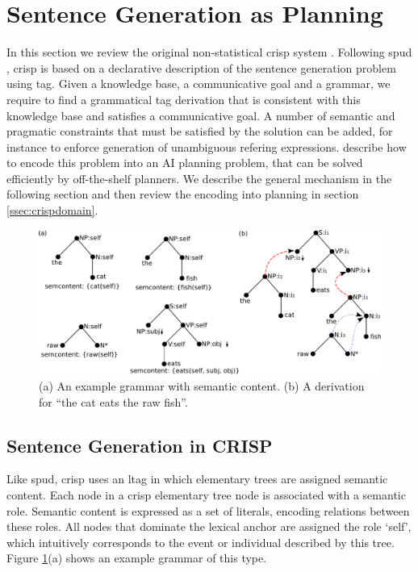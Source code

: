 \section{Sentence Generation as Planning}
\label{sec:crisp}
In this section we review the original non-statistical {\sc crisp} system \cite{kollerstone2007}. 
Following {\sc spud} \cite{stonedoran1997}, {\sc crisp} is based on a declarative description of the sentence generation problem using {\sc tag}. Given a knowledge base, a communicative goal and a grammar, we require to find a grammatical {\sc tag} derivation that is consistent with this knowledge base and satisfies a communicative goal. A number of semantic and pragmatic constraints that must be satisfied by the solution can be added, for instance to enforce generation of unambiguous refering expressions.  describe how to encode this problem into an AI planning problem, that can be solved efficiently by off-the-shelf planners. We describe the general mechanism in the following section and then review the encoding into planning in section \ref{ssec:crispdomain}. 
\begin{figure}[th]
\begin{center}
\includegraphics[width=.8\textwidth]{figures/grammar.pdf}
\caption{\label{fig:grammar}(a) An example grammar with semantic content. (b) A derivation for ``the cat eats the raw fish''. }
\end{center}
\end{figure}

\subsection{Sentence Generation in CRISP}
Like {\sc spud}, {\sc crisp} uses an {\sc ltag} in which elementary trees are assigned semantic content. Each node in a {\sc crisp} elementary tree node is associated with a semantic role. Semantic content is expressed as a set of literals, encoding relations between these roles. All nodes that dominate the lexical anchor are assigned the role `self', which intuitively corresponds to the event or individual described by this tree. Figure \ref{fig:grammar}(a) shows an example grammar of this type. 

